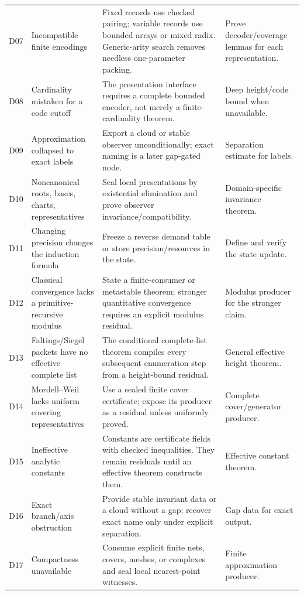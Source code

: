 \begin{longtable}{P{0.05\textwidth}P{0.22\textwidth}P{0.43\textwidth}P{0.25\textwidth}}
D07 & Incompatible finite encodings & Fixed records use checked pairing; variable records use bounded arrays or mixed radix. Generic-arity search removes needless one-parameter packing. & Prove decoder/coverage lemmas for each representation. \\
D08 & Cardinality mistaken for a code cutoff & The presentation interface requires a complete bounded encoder, not merely a finite-cardinality theorem. & Deep height/code bound when unavailable. \\
D09 & Approximation collapsed to exact labels & Export a cloud or stable observer unconditionally; exact naming is a later gap-gated node. & Separation estimate for labels. \\
D10 & Noncanonical roots, bases, charts, representatives & Seal local presentations by existential elimination and prove observer invariance/compatibility. & Domain-specific invariance theorem. \\
D11 & Changing precision changes the induction formula & Freeze a reverse demand table or store precision/resources in the state. & Define and verify the state update. \\
D12 & Classical convergence lacks a primitive-recursive modulus & State a finite-consumer or metastable theorem; stronger quantitative convergence requires an explicit modulus residual. & Modulus producer for the stronger claim. \\
D13 & Faltings/Siegel packets have no effective complete list & The conditional complete-list theorem compiles every subsequent enumeration step from a height-bound residual. & General effective height theorem. \\
D14 & Mordell--Weil lacks uniform covering representatives & Use a sealed finite cover certificate; expose its producer as a residual unless uniformly proved. & Complete cover/generator producer. \\
D15 & Ineffective analytic constants & Constants are certificate fields with checked inequalities. They remain residuals until an effective theorem constructs them. & Effective constant theorem. \\
D16 & Exact branch/axis obstruction & Provide stable invariant data or a cloud without a gap; recover exact name only under explicit separation. & Gap data for exact output. \\
D17 & Compactness unavailable & Consume explicit finite nets, covers, meshes, or complexes and seal local nearest-point witnesses. & Finite approximation producer. \\

\end{longtable}
